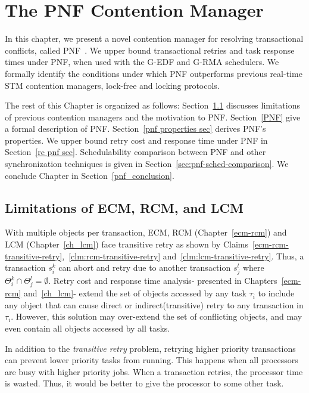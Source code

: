 \chapter{\label{ch_pnf}The PNF Contention Manager}
%
In this chapter, we present a novel contention manager for resolving transactional conflicts, called PNF~\cite{6509557}. We upper bound transactional retries and task response times under PNF, when used with the G-EDF and  G-RMA schedulers. We formally identify the conditions under which PNF outperforms previous real-time STM contention managers, lock-free and locking protocols.

The rest of this Chapter is organized as follows: Section~\ref{probelm description} discusses limitations of previous contention managers and the motivation to PNF. Section~\ref{PNF} give a formal description of PNF. Section~\ref{pnf properties sec} derives PNF's properties. We upper bound retry cost and response time under PNF in Section~\ref{rc pnf sec}. Schedulability comparison between PNF and other synchronization techniques is given in Section~\ref{sec:pnf-sched-comparison}. We conclude Chapter in Section~\ref{pnf_conclusion}.

\section{Limitations of ECM, RCM, and LCM}\label{probelm description}
%
With multiple objects per transaction, ECM, RCM (Chapter~\ref{ecm-rcm}) and LCM (Chapter~\ref{ch_lcm}) face transitive retry as shown by Claims~\ref{ecm-rcm-transitive-retry},~\ref{clm:rcm-transitive-retry} and~\ref{clm:lcm-transitive-retry}. Thus, a transaction $s_i^k$ can abort and retry due to another transaction $s_j^l$ where $\Theta_i^k \cap \Theta_j^l = \emptyset$. Retry cost and response time analysis- presented in Chapters~\ref{ecm-rcm} and~\ref{ch_lcm}- extend the set of objects accessed by any task $\tau_i$ to include any object that can cause direct or indirect(transitive) retry to any transaction in $\tau_i$. However, this solution may over-extend the set of conflicting objects, and may even contain all objects accessed by all tasks.

In addition to the \emph{transitive retry} problem, retrying higher priority transactions can prevent lower priority tasks from running. This happens when all processors are busy with higher priority jobs. When a transaction retries, the processor time is wasted. Thus, it would be better to give the processor to some other task.

